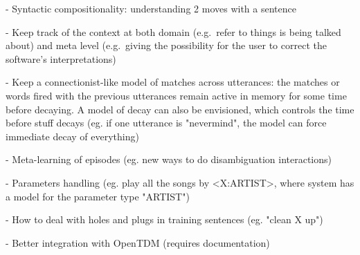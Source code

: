- Syntactic compositionality: understanding 2 moves with a sentence

- Keep track of the context at both domain (e.g.\ refer to things is being talked about) and meta level (e.g.\ giving the possibility for the user to correct the software's interpretations)

- Keep a connectionist-like model of matches across utterances: the matches or 
  words fired with the previous utterances remain active in memory for some 
  time before decaying. A model of decay can also be envisioned, which controls
  the time before stuff decays (eg. if one utterance is "nevermind", the model
  can force immediate decay of everything)

- Meta-learning of episodes (eg. new ways to do disambiguation interactions)

- Parameters handling (eg. play all the songs by <X:ARTIST>, where system has a
  model for the parameter type "ARTIST")
  
- How to deal with holes and plugs in training sentences (eg. "clean X up")

- Better integration with OpenTDM (requires documentation)



